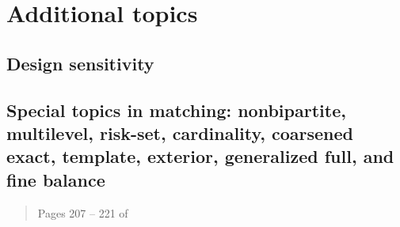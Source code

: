 \documentclass[12pt]{article}
\begin{document}
\begin{verse}  \end{verse}

\begin{verse}  \end{verse}

\section{Additional topics}

\subsection{Design sensitivity}

\begin{verse}  \end{verse}

\begin{verse}  \end{verse}

\begin{verse}  \end{verse}

\begin{verse}  \end{verse}

\subsection{Special topics in matching: nonbipartite, multilevel, risk-set, cardinality, coarsened exact, template, exterior, generalized full, and fine balance}\label{sec:nbp}

\begin{verse}  \end{verse}

\begin{verse}  \end{verse}

\begin{verse} Pages 207 -- 221 of  \end{verse}

\begin{verse}  \end{verse}

\begin{verse}  \end{verse}
\end{document}
